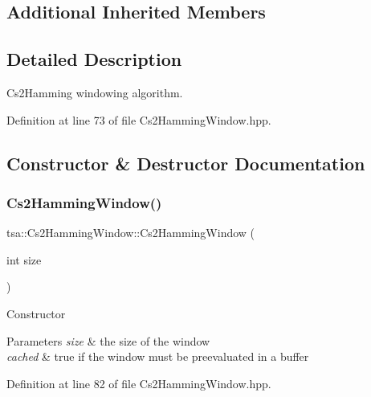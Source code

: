 \subsection*{Additional Inherited Members}


\subsection{Detailed Description}
Cs2\+Hamming windowing algorithm. 

Definition at line 73 of file Cs2\+Hamming\+Window.\+hpp.



\subsection{Constructor \& Destructor Documentation}
\mbox{\label{classtsa_1_1_cs2_hamming_window_a4ae0ec8d18145afbc446edef40842cf4}} 
\subsubsection{\texorpdfstring{Cs2\+Hamming\+Window()}{Cs2HammingWindow()}\hspace{0.1cm}{\footnotesize\ttfamily [1/2]}}
{\footnotesize\ttfamily tsa\+::\+Cs2\+Hamming\+Window\+::\+Cs2\+Hamming\+Window (\begin{DoxyParamCaption}\item[{int}]{size }\end{DoxyParamCaption})\hspace{0.3cm}{\ttfamily [inline]}}

Constructor


\begin{DoxyParams}{Parameters}
{\em size} & the size of the window \\
\hline
{\em cached} & true if the window must be preevaluated in a buffer \\
\hline
\end{DoxyParams}


Definition at line 82 of file Cs2\+Hamming\+Window.\+hpp.

\mbox{\label{classtsa_1_1_cs2_hamming_window_a3f342ff907141da428f5e4255dd7763f}} 
